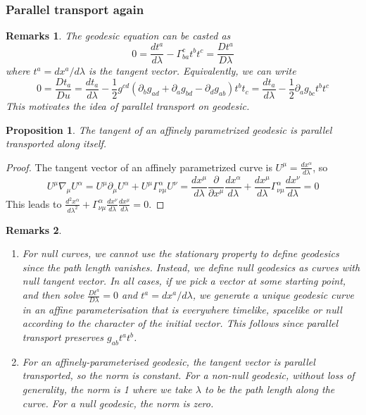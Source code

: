 \documentclass[a4paper]{article}
\newtheorem{remarks}{Remarks}[section]
\theoremstyle{new}
\newtheorem{prop}{Proposition}[section]
\begin{document}
\subsubsection*{Parallel transport again}
\begin{remarks}
The geodesic equation can be casted as
$$0=\frac{dt^a}{d\lambda}-\Gamma_{ba}^ct^bt^c=\frac{Dt^a}{D\lambda}$$
where $t^a=dx^a/d\lambda$ is the tangent vector. Equivalently, we can write
$$0=\frac{Dt_a}{Du}=\frac{dt_a}{d\lambda}-\frac{1}{2}g^{cd}(\partial_bg_{ad}+\partial_ag_{bd}-\partial_dg_{ab})t^bt_c=\frac{dt_a}{d\lambda}-\frac{1}{2}\partial_ag_{bc}t^bt^c$$
This motivates the idea of parallel transport on geodesic.
\end{remarks}
\begin{prop}
The tangent of an affinely parametrized geodesic is parallel transported along itself.
\end{prop}
\begin{proof}
The tangent vector of an affinely parametrized curve is $U^\mu=\frac{dx^\alpha}{d\lambda}$, so
$$U^\mu\nabla_\mu U^\alpha=U^\mu\partial_\mu U^\alpha+U^\mu\Gamma_{\nu\mu}^\alpha U^\nu=\frac{dx^\mu}{d\lambda}\frac{\partial}{\partial x^\mu}\frac{dx^\alpha}{d\lambda}+\frac{dx^\mu}{d\lambda}\Gamma_{\nu\mu}^\alpha\frac{dx^\nu}{d\lambda}=0$$
This leads to $\frac{d^2x^\alpha}{d\lambda^2}+\Gamma_{\nu\mu}^\alpha\frac{dx^\nu}{d\lambda}\frac{dx^\mu}{d\lambda}=0$.
\end{proof}
\begin{remarks}\leavevmode
\begin{enumerate}
    \item For null curves, we cannot use the stationary property to define geodesics since the path length vanishes. Instead, we define null geodesics as curves with null tangent vector. In all cases, if we pick a vector at some starting point, and then solve $\frac{Dt^a}{D\lambda}=0$ and $t^a=dx^a/d\lambda$, we generate a unique geodesic curve in an affine parameterisation that is everywhere timelike, spacelike or null according to the character of the initial vector. This follows since parallel transport preserves $g_{ab}t^at^b$.
    \item For an affinely-parameterised geodesic, the tangent vector is parallel transported, so the norm is constant. For a non-null geodesic, without loss of generality, the norm is 1 where we take $\lambda$ to be the path length along the curve. For a null geodesic, the norm is zero.
\end{enumerate}
\end{remarks}
\end{document}
